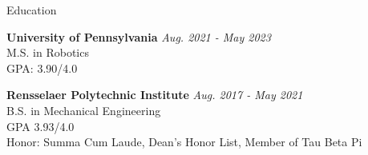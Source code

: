 \documentclass{resume} %
\begin{document}

\begin{rSection}{Education}

{\bf University of Pennsylvania} \hfill {\em Aug. 2021 - May 2023
} \\ 
M.S. in Robotics \\
GPA: 3.90/4.0

{\bf Rensselaer Polytechnic Institute} \hfill {\em Aug. 2017 - May 2021
} \\ 
B.S. in Mechanical Engineering \\
GPA 3.93/4.0 \smallskip \\
Honor: Summa Cum Laude, Dean's Honor List, Member of Tau Beta Pi

\end{rSection}

\end{document}

